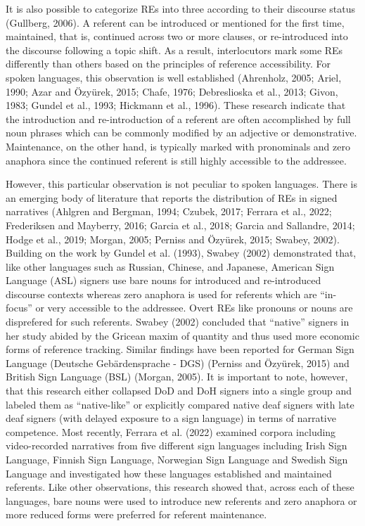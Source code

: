 \documentclass[]{elsarticle} %
\begin{document}
It is also possible to categorize REs into three according to their
discourse status (Gullberg, 2006). A referent can be introduced or
mentioned for the first time, maintained, that is, continued across two
or more clauses, or re-introduced into the discourse following a topic
shift. As a result, interlocutors mark some REs differently than others
based on the principles of reference accessibility. For spoken
languages, this observation is well established (Ahrenholz, 2005; Ariel,
1990; Azar and Özyürek, 2015; Chafe, 1976; Debreslioska et al., 2013;
Givon, 1983; Gundel et al., 1993; Hickmann et al., 1996). These research
indicate that the introduction and re-introduction of a referent are
often accomplished by full noun phrases which can be commonly modified
by an adjective or demonstrative. Maintenance, on the other hand, is
typically marked with pronominals and zero anaphora since the continued
referent is still highly accessible to the addressee.

However, this particular observation is not peculiar to spoken
languages. There is an emerging body of literature that reports the
distribution of REs in signed narratives (Ahlgren and Bergman, 1994;
Czubek, 2017; Ferrara et al., 2022; Frederiksen and Mayberry, 2016;
Garcia et al., 2018; Garcia and Sallandre, 2014; Hodge et al., 2019;
Morgan, 2005; Perniss and Özyürek, 2015; Swabey, 2002). Building on the
work by Gundel et al. (1993), Swabey (2002) demonstrated that, like
other languages such as Russian, Chinese, and Japanese, American Sign
Language (ASL) signers use bare nouns for introduced and re-introduced
discourse contexts whereas zero anaphora is used for referents which are
``in-focus'' or very accessible to the addressee. Overt REs like
pronouns or nouns are disprefered for such referents. Swabey (2002)
concluded that ``native'' signers in her study abided by the Gricean
maxim of quantity and thus used more economic forms of reference
tracking. Similar findings have been reported for German Sign Language
(Deutsche Gebärdensprache - DGS) (Perniss and Özyürek, 2015) and British
Sign Language (BSL) (Morgan, 2005). It is important to note, however,
that this research either collapsed DoD and DoH signers into a single
group and labeled them as ``native-like'' or explicitly compared native
deaf signers with late deaf signers (with delayed exposure to a sign
language) in terms of narrative competence. Most recently, Ferrara et
al. (2022) examined corpora including video-recorded narratives from
five different sign languages including Irish Sign Language, Finnish
Sign Language, Norwegian Sign Language and Swedish Sign Language and
investigated how these languages established and maintained referents.
Like other observations, this research showed that, across each of these
languages, bare nouns were used to introduce new referents and zero
anaphora or more reduced forms were preferred for referent maintenance.
\end{document}
